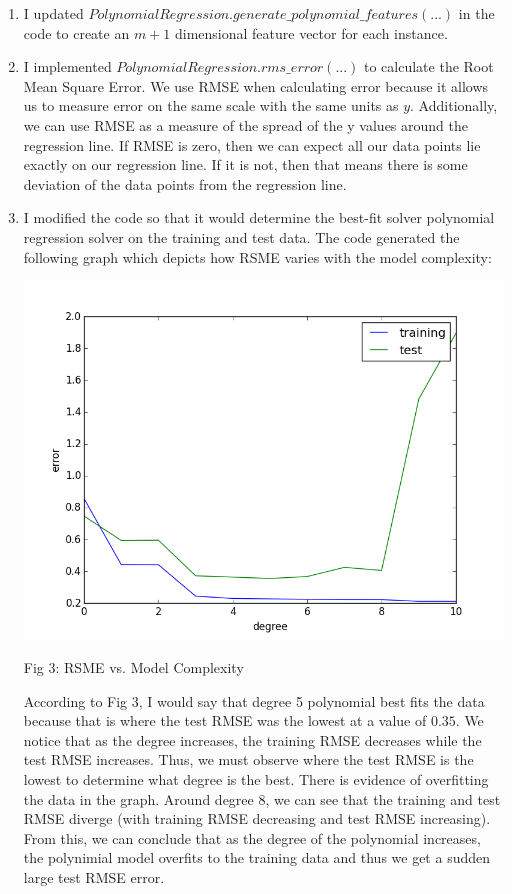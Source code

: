 \documentclass[11pt]{article}
\begin{document}
\begin{enumerate}[resume]
\item I updated $PolynomialRegression.generate\_polynomial\_features(...)$ in the code to create an $m + 1$ dimensional feature vector for each instance.

\item I implemented $PolynomialRegression.rms\_error(...)$ to calculate the Root Mean Square Error. We use RMSE when calculating error because it allows us to measure error on the same scale with the same units as $y$. Additionally, we can use RMSE as a measure of the spread of the y values around the regression line. If RMSE is zero, then we can expect all our data points lie exactly on our regression line. If it is not, then that means there is some deviation of the data points from the regression line.

\item I modified the code so that it would determine the best-fit solver polynomial regression solver on the training and test data. The code generated the following graph which depicts how RSME varies with the model complexity: \\
\centerline{\includegraphics[scale=.7]{part_i_plot}} 
\centerline{Fig 3: RSME vs. Model Complexity}
According to Fig 3, I would say that degree 5 polynomial best fits the data because that is where the test RMSE was the lowest at a value of $0.35$. We notice that as the degree increases, the training RMSE decreases while the test RMSE increases. Thus, we must observe where the test RMSE is the lowest to determine what degree is the best. There is evidence of overfitting the data in the graph. Around degree 8, we can see that the training and test RMSE diverge (with training RMSE decreasing and test RMSE increasing). From this, we can conclude that as the degree of the polynomial increases, the polynimial model overfits to the training data and thus we get a sudden large test RMSE error.

\end{enumerate}
\end{document}
